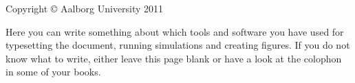 \thispagestyle{empty}
{\small
\strut\vfill %
\noindent Copyright \copyright{} Aalborg University 2011\par
\vspace{0.2cm}
\noindent Here you can write something about which tools and software you have used for typesetting the document, running simulations and creating figures. If you do not know what to write, either leave this page blank or have a look at the colophon in some of your books.
}
\clearpage


